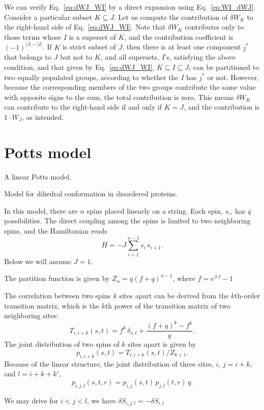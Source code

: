 \documentclass[reprint, superscriptaddress]{revtex4-1}
\begin{document}
We can verify Eq.~\eqref{eq:dWJ_WI}
by a direct expansion using Eq.~\eqref{eq:WI_dWJ}.
%
Consider a particular subset $K \subseteq J$.
Let us compute the contribution of $\delta W_K$
to the right-hand side of Eq.~\eqref{eq:dWJ_WI}.
%
Note that $\delta W_K$ contributes only to those terms
whose $I$ is a superset of $K$,
and the contribution coefficient is $(-1)^{|J|-|I|}$.
%
If $K$ is strict subset of $J$,
then there is at least one component $j^*$ that belongs to $J$
but not to $K$,
and all supersets, $I$'s,
satisfying the above condition, and that given by Eq.~\eqref{eq:dWJ_WI},
$K \subseteq I \subseteq J$,
can be partitioned to two equally populated groups,
according to whether the $I$ has $j^*$ or not.
%
However, because the corresponding members of the two groups
contribute the same value with opposite signs to the sum,
the total contribution is zero.
%
This means $\delta W_K$ can contribute to the right-hand side
if and only if $K = J$, and the contribution is $1 \cdot W_J$,
as intended.




\section{\label{sec:Potts}
Potts model
}

A linear Potts model.

Model for dihedral conformation in disordered proteins.

In this model, there are $n$ spins placed linearly on a string.
%
Each spin, $s_i$, has $q$ possibilities.
%
The direct coupling among the spins
is limited to two neighboring spins, and the Hamiltonian reads
$$
H = -J \sum_{i = 1}^{n-1} s_i \, s_{i+1}.
$$
Below we will assume $J = 1$.

The partition function is given by
$Z_n = q (f + q)^{n-1}$,
where $f = e^{\beta \, J} - 1$

The correlation between two spins $k$ sites apart
can be derived from the $k$th-order transition matrix,
which is the $k$th power of the transition matrix
of two neighboring sites:
$$
T_{i,i+k}(s, t) = f^k \, \delta_{s,t}
+ \frac{ (f + q)^k - f^k } { q }.
$$
The joint distribution of two spins of $k$ sites apart
is given by
$$
p_{i, i+k}(s,t) = T_{i, i+k}(s,t) / Z_{k+1}.
$$
Because of the linear structure,
the joint distribution of three sites, $i$, $j = i+k$, and $l = i+k+k'$,
$$
p_{i, j, l}(s,t,r) = p_{i, j}(s,t) \, p_{j, l}(t,r) \, q.
$$

We may drive for $i < j < l$, we have
$\delta S_{i, j, l} = -\delta S_{i, l}$




\end{document}
